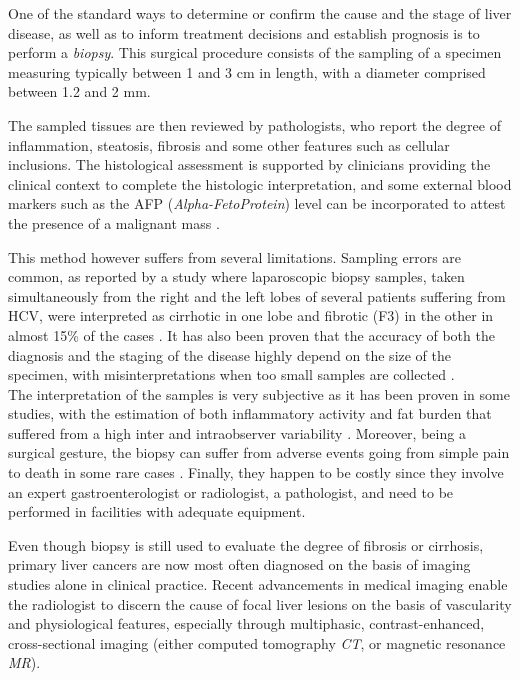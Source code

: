 \documentclass[]{article}
\begin{document}
One of the standard ways to determine or confirm the cause and the stage
of liver disease, as well as to inform treatment decisions and establish
prognosis is to perform a \emph{biopsy}. This surgical procedure consists of the sampling of a specimen measuring typically between 1 and 3 cm in length, with a diameter comprised between 1.2 and 2 mm\cite{Bravo2001}.

The sampled tissues are then reviewed by pathologists, who report the
degree of inflammation, steatosis, fibrosis and some other features such
as cellular inclusions. The histological assessment is supported by
clinicians providing the clinical context to complete the histologic
interpretation, and some external blood markers such as the AFP
(\emph{Alpha-FetoProtein}) level can be incorporated to attest the presence of
a malignant mass \cite{Bai2017a, Heimbach2018}.

This method however suffers from several limitations. Sampling errors
are common, as reported by a study where laparoscopic biopsy samples,
taken simultaneously from the right and the left lobes of several
patients suffering from HCV, were interpreted as cirrhotic in one lobe
and fibrotic (F3) in the other in almost 15\% of the cases \cite{Regev2002}. It has also been proven that the
accuracy of both the diagnosis and the staging of the disease highly
depend on the size of the specimen, with misinterpretations when too
small samples are collected \cite{Colloredo2003}.\\
The interpretation of the samples is very subjective as it has been
proven in some studies, with the estimation of both inflammatory
activity and fat burden that suffered from a high inter and
intraobserver variability \cite{Bedossa1994}.
Moreover, being a surgical gesture, the biopsy can suffer from adverse
events going from simple pain to death in some rare cases \cite{Rockey2009, Castera2001, Seeff2010, Piccinino1986}. Finally, they happen to be costly since
they involve an expert gastroenterologist or radiologist, a pathologist,
and need to be performed in facilities with adequate equipment.

Even though biopsy is still used to evaluate the degree of fibrosis or
cirrhosis, primary liver cancers are now most often diagnosed on the
basis of imaging studies alone in clinical practice. Recent advancements
in medical imaging enable the radiologist to discern the cause of focal
liver lesions on the basis of vascularity and physiological features,
especially through multiphasic, contrast-enhanced, cross-sectional
imaging (either computed tomography \emph{CT}, or magnetic resonance
\emph{MR}).
\end{document}

